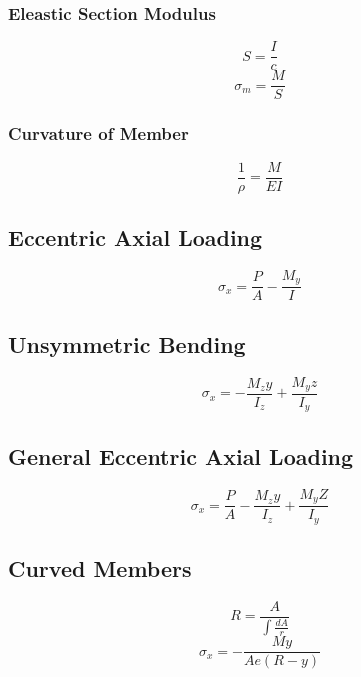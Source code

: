 \documentclass[10pt,landscape]{article}
\begin{document}
\begin{multicols}{3}
\subsubsection{Eleastic Section Modulus}
\begin{equation}
    S=\frac{I}{c}
\end{equation}
\begin{equation}
    \sigma_m=\frac{M}{S}
\end{equation}
\subsubsection{Curvature of Member}
\begin{equation}
    \frac{1}{\rho}=\frac{M}{EI}
\end{equation}
\subsection{Eccentric Axial Loading}
\begin{equation}
    \sigma_x=\frac{P}{A}-\frac{M_y}{I}    
\end{equation}
\subsection{Unsymmetric Bending}
\begin{equation}
    \sigma_x=-\frac{M_zy}{I_z}+\frac{M_yz}{I_y}
\end{equation}
\subsection{General Eccentric Axial Loading}
\begin{equation}
    \sigma_x=\frac{P}{A}-\frac{M_zy}{I_z}+\frac{M_yZ}{I_y}
\end{equation}
\subsection{Curved Members}
\begin{equation}
    R=\frac{A}{\int\frac{dA}{r}}
\end{equation}
\begin{equation}
    \sigma_x=-\frac{My}{Ae(R-y)}
\end{equation}

\end{multicols}
\end{document}
